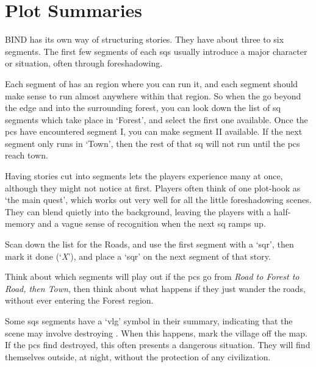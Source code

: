 \section{Plot Summaries}
\label{sqSummaries}

\begin{multicols}{2}

\noindent
BIND has its own way of structuring stories.
They have about three to six \glspl{segment}.
The first few \glspl{segment} of each \glspl{sq} usually introduce a major character or situation, often through foreshadowing.

Each \gls{segment} of  has an region where you can run it, and each \gls{segment} should make sense to run almost anywhere within that region.
So when the  go beyond the \gls{edge} and into the surrounding forest, you can look down the list of \gls{sq} \glspl{segment} which take place in `Forest', and select the first one available.
Once the \glspl{pc} have encountered \gls{segment} I, you can make \gls{segment} II available.
If the next \gls{segment} only runs in `Town', then the rest of that \gls{sq} will not run until the \glspl{pc} reach \gls{town}.

Having stories cut into \glspl{segment} lets the players experience many at once, although they might not notice at first.
Players often think of one plot-hook as `the main quest', which works out very well for all the little foreshadowing scenes.
They can blend quietly into the background, leaving the players with a half-memory and a vague sense of recognition when the next \gls{sq} ramps up.

Scan down the list  for the Roads, and use the first \gls{segment} with a `\gls{sqr}', then mark it done (`\textit{X}'), and place a `\gls{sqr}' on the next \gls{segment} of that story.

Think about which \glspl{segment} will play out if the \glspl{pc} go from \textit{Road to Forest to Road, then Town}, then think about what happens if they just wander the roads, without ever entering the Forest region.

Some \glspl{sq} \glspl{segment} have a `\gls{vlg}' symbol in their summary, indicating that the scene may involve destroying .
When this happens, mark the \gls{village} off the map.
If the \glspl{pc} find  destroyed, this often presents a dangerous situation.
They will find themselves outside, at night, without the protection of any civilization.


\end{multicols}
